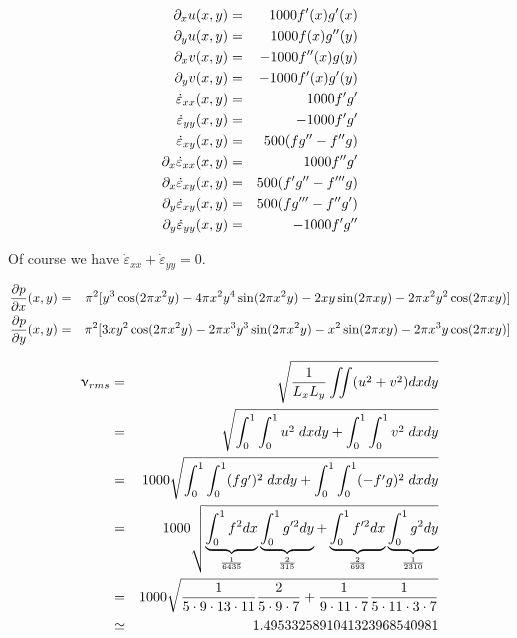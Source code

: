 \begin{eqnarray}
\partial_x u (x,y)&=& 1000f'(x)g'(x)\nonumber\\
\partial_y u (x,y)&=& 1000f(x)g''(y) \nonumber\\
\partial_x v (x,y)&=& -1000f''(x)g(y) \nonumber\\
\partial_y v (x,y)&=& -1000f'(x)g'(y)\nonumber\\
\dot\varepsilon_{xx}(x,y) &=& 1000f'g' \nonumber\\
\dot\varepsilon_{yy}(x,y) &=& -1000f'g' \nonumber\\
\dot\varepsilon_{xy}(x,y) &=&  500( fg'' - f''g )\nonumber\\
\partial_x \dot\varepsilon_{xx} (x,y)&=& 1000f''g'\nonumber\\
\partial_x \dot\varepsilon_{xy} (x,y)&=& 500( f'g'' - f'''g )\nonumber\\
\partial_y \dot\varepsilon_{xy} (x,y)&=& 500( fg''' - f''g' )\nonumber\\
\partial_y \dot\varepsilon_{yy} (x,y)&=&  -1000f'g''\nonumber
\end{eqnarray}

Of course we have $\dot\varepsilon_{xx}+\dot\varepsilon_{yy}=0$.

\begin{eqnarray}
\frac{\partial p}{\partial x} (x,y)
&=& \pi^2 [ y^3 \cos(2\pi x^2 y) -4\pi x^2y^4  \sin(2\pi x^2 y) -2xy \sin(2\pi x y) -2 \pi x^2 y^2 \cos(2\pi x y)  ]\nonumber\\
\frac{\partial p}{\partial y} (x,y)
&=& \pi^2 [3xy^2 \cos(2\pi x^2 y) -2\pi x^3y^3\sin(2\pi x^2 y)
-x^2 \sin(2\pi x y) -2\pi x^3 y \cos(2\pi x y) ]
\nonumber
\end{eqnarray}


\begin{eqnarray}
\upnu_{rms}
&=&\sqrt{ \frac{1}{L_xL_y} \iint (u^2+v^2) dxdy   }  \nonumber\\
&=&\sqrt{  \int_0^1\int_0^1 u^2 \; dxdy  +  \int_0^1\int_0^1 v^2 \; dxdy } \nonumber\\
&=&1000\sqrt{  \int_0^1\int_0^1 (fg')^2\; dxdy  +  \int_0^1\int_0^1 (-f'g)^2 \; dxdy } \nonumber\\
&=&1000\sqrt{  
\underbrace{\int_0^1 f^2 dx }_{\frac{1}{6435}}
\underbrace{\int_0^1 g'^2 dy  }_{\frac{2}{315}}
+  
\underbrace{\int_0^1 f'^2 dx}_{\frac{2}{693}} 
\underbrace{\int_0^1 g^2 dy}_{\frac{1}{2310}} 
} \nonumber\\
&=& 1000 \sqrt{ \frac{1}{5\cdot 9 \cdot 13 \cdot 11} \frac{2}{5\cdot 9\cdot 7} + \frac{1}{9\cdot 11 \cdot 7} \frac{1}{5 \cdot 11 \cdot 3 \cdot 7}} \nonumber\\
&\simeq& 1.4953325891041323968540981
\end{eqnarray}


